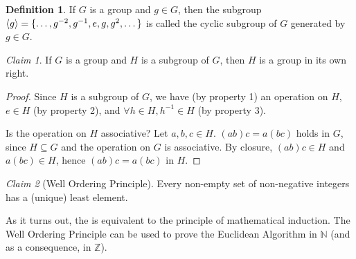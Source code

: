 \documentclass[12pt,letterpaper,DIV=11,final]{scrartcl}
\theoremstyle{plain}
\theoremstyle{definition}
\newtheorem{definition}{Definition}[section]
\theoremstyle{remark}
\newtheorem{claim}{Claim}
\begin{document}
\begin{definition}\label{def:cyclicsubgroup}
  If $G$ is a group and $g \in G$, then the subgroup $\braket{g} = \{ \dots, g^{-2}, g^{-1}, e, g, g^2, \dots \}$ is called the cyclic subgroup of $G$ generated by $g \in G$.
\end{definition}

\begin{claim}
  If $G$ is a group and $H$ is a subgroup of $G$, then $H$ is a group in its own right.

  \begin{proof}
    Since $H$ is a subgroup of $G$, we have (by property 1) an operation on $H$, $e \in H$ (by property 2), and $\forall h \in H, h^{-1} \in H$ (by property 3).

    Is the operation on $H$ associative?
    Let $a, b, c \in H$.
    $(ab) c = a (bc)$ holds in $G$, since $H \subseteq G$ and the operation on $G$ is associative.
    By closure, $(ab) c \in H$ and $a (bc) \in H$, hence $(ab) c = a (bc)$ in $H$.
  \end{proof}
\end{claim}

\begin{claim}[Well Ordering Principle]\label{claim:wop}
  Every non-empty set of non-negative integers has a (unique) least element.
\end{claim}

As it turns out, the  is equivalent to the principle of mathematical induction.
The Well Ordering Principle can be used to prove the Euclidean Algorithm in $\mathbb{N}$ (and as a consequence, in $\mathbb{Z}$).
\end{document}

